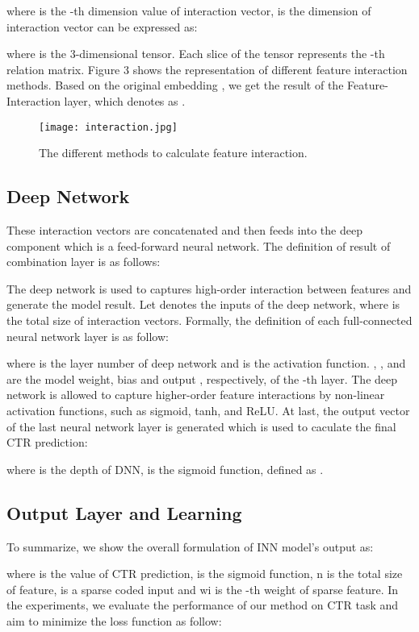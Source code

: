 \documentclass[journal]{IEEEtran}
\begin{document}
where  is the -th dimension value of interaction vector,  is the dimension of interaction vector  can be expressed as:

where  is the 3-dimensional tensor. Each slice  of the tensor  represents the -th relation matrix. Figure 3 shows the representation of different feature interaction methods. Based on the original embedding , we get the result of the Feature-Interaction layer, which denotes as .
\begin{figure}
\centering
	\texttt{[image: interaction.jpg]}
\caption{The different methods to calculate feature interaction.}
	\label{fig_interaction}       \end{figure}
\subsection{Deep Network}
These interaction vectors  are concatenated and then feeds into the deep component which is a feed-forward neural network. The definition of result of combination layer is as follows:

The deep network is used to captures high-order interaction between features and generate the model result. Let  denotes the inputs of the deep network, where  is the total size of interaction vectors. Formally, the definition of each  full-connected neural network layer is as follow:

where  is the layer number of deep network and  is the activation function. , , and  are the model weight, bias and output , respectively, of the -th layer. The deep network is allowed to capture higher-order feature interactions by non-linear activation functions, such as sigmoid, tanh, and ReLU. At last, the output vector of the last neural network layer is generated which is used to caculate the final CTR prediction:

where  is the depth of DNN,  is the sigmoid function, defined as .
\subsection{Output Layer and Learning}
To summarize, we show the overall formulation of INN model’s output as: 

where  is the value of CTR prediction,  is the sigmoid function, n is the total size of feature,  is a sparse coded input and wi is the -th weight of sparse feature. In the experiments, we evaluate the performance of our method on CTR task and aim to minimize the loss function as follow:
\end{document}
